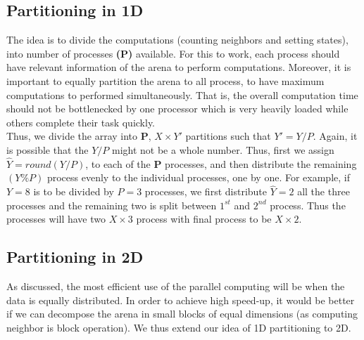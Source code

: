 \documentclass[a4paper, 10pt, conference]{IEEEtran}      %
\begin{document}
	\subsection{Partitioning in 1D}
	
	The idea is to divide the computations (counting neighbors and setting states), into number of processes \textbf{(P)} available. For this to work, each process should have relevant information of the arena to perform computations. Moreover, it is important to equally partition the arena to all process, to have maximum computations to performed simultaneously. That is, the overall computation time should not be bottlenecked by one processor which is very heavily loaded while others complete their task quickly.\\
	
	Thus, we divide the array into \textbf{P},  $X \times Y'$  partitions such that $ Y' = Y/P$. Again, it is possible that the $Y/P$ might not be a whole number. Thus, first we assign $ \hat{Y} = round(Y/P)$, to each of the \textbf{P} processes, and then distribute the remaining $(Y \% P)$ process evenly to the individual processes, one by one. For example, if $Y = 8$ is to be divided by $P = 3$ processes, we first distribute $\hat{Y} = 2$ all the three processes and the remaining two is split between $1^{st}$ and $2^{nd}$ process. Thus the processes will have two $X \times 3$ process with final process to be $X \times 2$.
	
	\subsection{Partitioning in 2D}
	
	As discussed, the most efficient use of the parallel computing will be when the data is equally distributed. In order to achieve high speed-up, it would be better if we can decompose the arena in small blocks of equal dimensions (as computing neighbor is block operation). We thus extend our idea of 1D partitioning to 2D.\\
	
\end{document}
